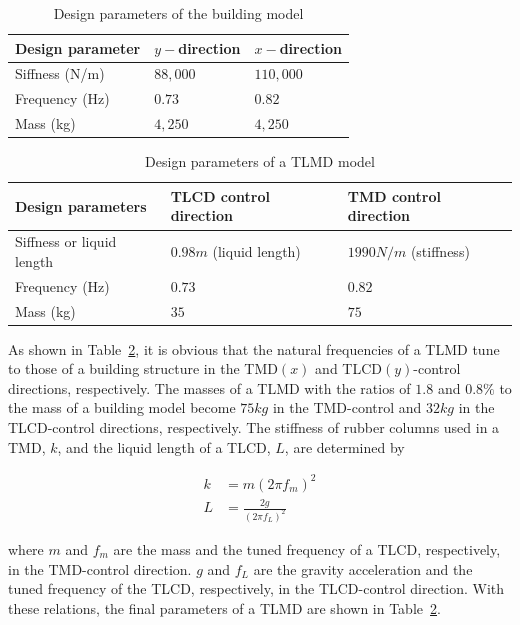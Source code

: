 \begin{table}[ht]
\centering
\begin{tabularx}{\textwidth}{@{}X|X|X@{}}
\toprule[1pt]\midrule[0.3pt]
Design parameter & $y-$direction & $x-$direction\\ \hline
Siffness (N/m) & $88,000$ & $110,000$\\
Frequency (Hz) & $0.73$ & $0.82$\\
Mass (kg) & $4,250$ & $4,250$\\
\bottomrule
\end{tabularx}
\caption{Design parameters of the building model}
\label{tab:5-2}
\end{table}

\begin{table}[ht]
\centering
\begin{tabularx}{\textwidth}{@{}X|X|X@{}}
\toprule[1pt]\midrule[0.3pt]
Design parameters & TLCD control direction & TMD control direction\\ \hline
Siffness or liquid length & $0.98m$ (liquid length) & $1990N/m$ (stiffness)\\
Frequency (Hz) & $0.73$ & $0.82$\\
Mass (kg) & $35$ & $75$\\
\bottomrule
\end{tabularx}
\caption{Design parameters of a TLMD model}
\label{tab:5-3}
\end{table}

As shown in Table~\ref{tab:5-3}, it is obvious that the natural frequencies of a TLMD tune to those of a building structure in the TMD$(x)$ and TLCD$(y)$-control directions, respectively. The masses of a TLMD with the ratios of $1.8$ and $0.8\%$ to the mass of a building model become $75kg$ in the TMD-control and $32kg$ in the TLCD-control directions, respectively. The stiffness of rubber columns used in a TMD, $k$, and the liquid length of a TLCD, $L$, are determined by

\begin{align}
k&=m\left(2\pi f_{m}\right)^{2} \label{eq:5-1} \\
L&=\frac{2g}{\left(2\pi f_{L}\right)^{2}} \label{eq:5-2}
\end{align}

where $m$ and $f_{m}$ are the mass and the tuned frequency of a TLCD, respectively, in the TMD-control direction. $g$ and $f_{L}$ are the gravity acceleration and the tuned frequency of the TLCD, respectively, in the TLCD-control direction. With these relations, the final parameters of a TLMD are shown in Table~\ref{tab:5-3}.








